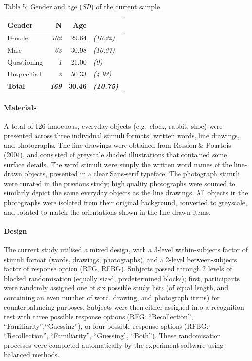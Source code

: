 \documentclass[
  11pt,
]{article}
\begin{document}
Table 5: Gender and age (\emph{SD}) of the current sample.

\begin{table}[!h]
\centering
\begin{tabular}{l>{}rr>{}l}
\toprule
Gender & N & Age &  \\
\midrule
Female & \em{102} & 29.64 & \em{(10.22)}\\
Male & \em{63} & 30.98 & \em{(10.97)}\\
Questioning & \em{1} & 21.00 & \em{(0)}\\
Unspecified & \em{3} & 50.33 & \em{(4.93)}\\
\textbf{Total} & \textbf{\em{169}} & \textbf{30.46} & \textbf{\em{(10.75)}}\\
\bottomrule
\end{tabular}
\end{table}

\hypertarget{materials-2}{%
\paragraph{Materials}\label{materials-2}}

A total of 126 innocuous, everyday objects (e.g.~clock, rabbit, shoe)
were presented across three individual stimuli formats: written words,
line drawings, and photographs. The line drawings were obtained from
Rossion \& Pourtois (2004), and consisted of greyscale shaded
illustrations that contained some surface details. The word stimuli were
simply the written word names of the line-drawn objects, presented in a
clear Sans-serif typeface. The photograph stimuli were curated in the
previous study; high quality photographs were sourced to similarly
depict the same everyday objects as the line drawings. All objects in
the photographs were isolated from their original background, converted
to greyscale, and rotated to match the orientations shown in the
line-drawn items.

\hypertarget{design-2}{%
\paragraph{Design}\label{design-2}}

The current study utilised a mixed design, with a 3-level
within-subjects factor of stimuli format (words, drawings, photographs),
and a 2-level between-subjects factor of response option (RFG, RFBG).
Subjects passed through 2 levels of blocked randomization (equally
sized, predetermined blocks); first, participants were randomly assigned
one of six possible study lists (of equal length, and containing an even
number of word, drawing, and photograph items) for counterbalancing
purposes. Subjects were then either assigned into a recognition test
with three possible response options (RFG: ``Recollection'',
``Familiarity'',``Guessing''), or four possible response options (RFBG:
``Recollection'', ``Familiarity'', ``Guessing'', ``Both''). These
randomisation processes were completed automatically by the experiment
software using balanced methods.
\end{document}
